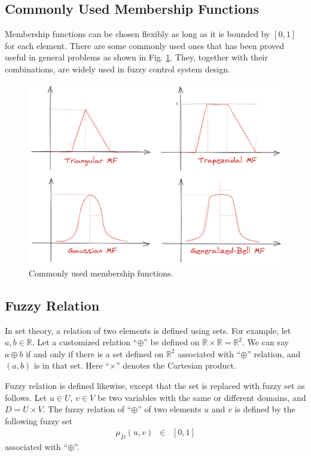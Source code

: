 \subsection{Commonly Used Membership Functions}

Membership functions can be chosen flexibly as long as it is bounded by $[0, 1]$ for each element. There are some commonly used ones that has been proved useful in general problems as shown in Fig. \ref{ch:fcs:fig:commonmf}. They, together with their combinations, are widely used in fuzzy control system design.

\begin{figure}
	\centering
	\includegraphics[width=350pt]{chapters/ch-fuzzy-control-system/figures/commonmf.png}
	\caption{Commonly used membership functions.} \label{ch:fcs:fig:commonmf}
\end{figure}





\subsection{Fuzzy Relation}

In set theory, a relation of two elements is defined using sets. For example, let $a, b \in \mathbb{R}$. Let a customized relation ``$\oplus$'' be defined on $\mathbb{R} \times \mathbb{R} = \mathbb{R}^2$. We can say $a \oplus b$ if and only if there is a set defined on $\mathbb{R}^2$ associated with ``$\oplus$'' relation, and $(a,b)$ is in that set. Here ``$\times$'' denotes the Cartesian product.

Fuzzy relation is defined likewise, except that the set is replaced with fuzzy set as follows. Let $u\in U$, $v \in V$ be two variables with the same or different domains, and $D=U \times V$. The fuzzy relation of ``$\oplus$'' of two elements $u$ and $v$ is defined by the following fuzzy set
\begin{eqnarray}
	\mu_{\tilde{D}} (u,v) &\in& [0, 1] \nonumber
\end{eqnarray}
associated with ``$\oplus$''.

